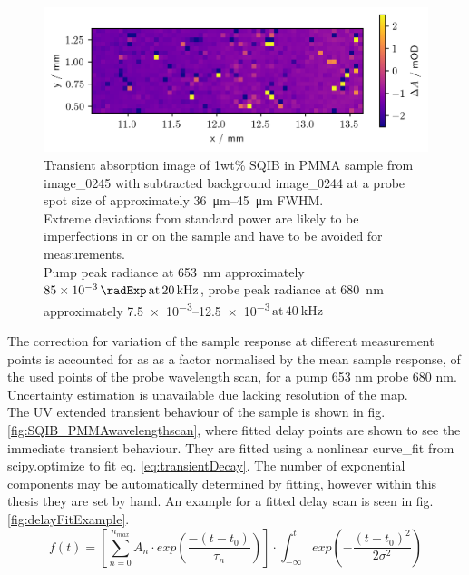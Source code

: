\documentclass[twoside,openright]{scrreprt}
\def\pumpExp#1{\ensuremath{\SI{#1}{\radExp}\,\mathrm{at}\, \SI{20}{\kilo\hertz}}}
\def\frep#1{\ensuremath{\,\mathrm{at}\, \SI{#1}{\kilo\hertz}}}
\begin{document}
\begin{figure}[hbt]
\centering
\includegraphics[scale=1]{images/1percentSQIBinPMMA_Sample653-680Image.png}
\caption{Transient absorption image of 1wt\% SQIB in PMMA sample from image\_0245 with subtracted background image\_0244 at a probe spot size of approximately \SIrange{36}{45}{\micro\meter} FWHM.\\ Extreme deviations from standard power are likely to be imperfections in or on the sample and have to be avoided for measurements.\\ Pump peak radiance at \SI{653}{\nano\meter} approximately \pumpExp{85e-3}, probe peak radiance at \SI{680}{\nano\meter} approximately \SIrange{7.5e-3}{12.5e-3}{\radExp}\frep{40} \label{fig:TA_image_sample}}
\end{figure}

The correction for variation of the sample response at different measurement points is accounted for as as a factor normalised by the mean sample response, of the used points of the probe wavelength scan, for a pump 653 nm probe 680 nm. Uncertainty estimation is unavailable due lacking resolution of the map.\\
The UV extended transient behaviour of the sample is shown in fig. \ref{fig:SQIB_PMMAwavelengthscan}, where fitted delay points are shown to see the immediate transient behaviour. They are fitted using a nonlinear curve\_fit from scipy.optimize to fit eq. \ref{eq:transientDecay}. The number of exponential components may be automatically determined by fitting, however within this thesis they are set by hand. An example for a fitted delay scan is seen in fig. \ref{fig:delayFitExample}.
\begin{equation}\label{eq:transientDecay}
f(t) = \left[\sum_{n=0}^{n_{max}} A_n\cdot exp \left(\frac{-(t-t_0)}{\tau_n}\right)\right]\cdot \int_{-\infty}^t exp\left(-\frac{(t-t_0)^2}{2\sigma^2}\right)
\end{equation}
\end{document}
